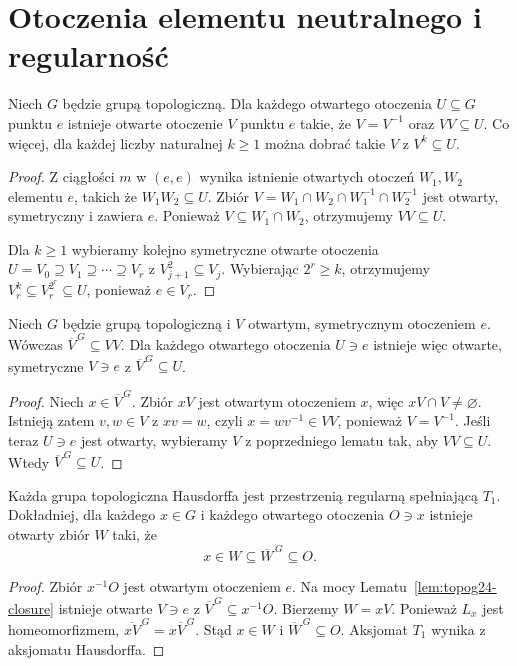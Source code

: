 \section{Otoczenia elementu neutralnego i regularność}
\label{sec:topog24-neighborhoods}

\begin{lemat}
\label{lem:topog24-small-neighborhoods}
Niech \(G\) będzie grupą topologiczną.
Dla każdego otwartego otoczenia
\(U\subseteq G\) punktu \(e\) istnieje
otwarte otoczenie \(V\) punktu \(e\)
takie, że \(V=V^{-1}\) oraz \(VV\subseteq U\).
Co więcej, dla każdej liczby naturalnej
\(k\ge1\) można dobrać takie \(V\)
z \(V^k\subseteq U\).
\end{lemat}
\begin{proof}
Z ciągłości \(m\) w \((e,e)\)
wynika istnienie otwartych otoczeń
\(W_1,W_2\) elementu \(e\), takich że
\(W_1W_2\subseteq U\).
Zbiór
\(V=W_1\cap W_2\cap W_1^{-1}\cap W_2^{-1}\)
jest otwarty, symetryczny i zawiera \(e\).
Ponieważ \(V\subseteq W_1\cap W_2\),
otrzymujemy \(VV\subseteq U\).

Dla \(k\ge1\) wybieramy kolejno
symetryczne otwarte otoczenia
\(U=V_0\supseteq V_1\supseteq\cdots\supseteq V_r\)
z \(V_{j+1}^2\subseteq V_j\).
Wybierając \(2^r\ge k\),
otrzymujemy \(V_r^k\subseteq
V_r^{2^r}\subseteq U\), ponieważ \(e\in V_r\).
\end{proof}

\begin{lemat}
\label{lem:topog24-closure}
Niech \(G\) będzie grupą topologiczną
i \(V\) otwartym, symetrycznym otoczeniem \(e\).
Wówczas \(\overline V^{\,G}\subseteq VV\).
Dla każdego otwartego otoczenia \(U\ni e\)
istnieje więc otwarte, symetryczne \(V\ni e\)
z \(\overline V^{\,G}\subseteq U\).
\end{lemat}
\begin{proof}
Niech \(x\in\overline V^{\,G}\).
Zbiór \(xV\) jest otwartym otoczeniem \(x\),
więc \(xV\cap V\neq\varnothing\).
Istnieją zatem \(v,w\in V\)
z \(xv=w\), czyli \(x=wv^{-1}\in VV\),
ponieważ \(V=V^{-1}\).
Jeśli teraz \(U\ni e\) jest otwarty,
wybieramy \(V\) z poprzedniego lematu
tak, aby \(VV\subseteq U\).
Wtedy \(\overline V^{\,G}\subseteq U\).
\end{proof}

\begin{twierdzenie}
\label{thm:topog24-regular}
Każda grupa topologiczna Hausdorffa
jest przestrzenią regularną spełniającą \(T_1\).
Dokładniej, dla każdego \(x\in G\)
i każdego otwartego otoczenia \(O\ni x\)
istnieje otwarty zbiór \(W\) taki, że
\[
 x\in W\subseteq\overline W^{\,G}\subseteq O.
\]
\end{twierdzenie}
\begin{proof}
Zbiór \(x^{-1}O\) jest otwartym
otoczeniem \(e\). Na mocy
Lematu~\ref{lem:topog24-closure}
istnieje otwarte \(V\ni e\)
z \(\overline V^{\,G}\subseteq x^{-1}O\).
Bierzemy \(W=xV\).
Ponieważ \(L_x\) jest homeomorfizmem,
\(\overline{xV}^{\,G}=x\overline V^{\,G}\).
Stąd \(x\in W\) i
\(\overline W^{\,G}\subseteq O\).
Aksjomat \(T_1\) wynika
z aksjomatu Hausdorffa.
\end{proof}

